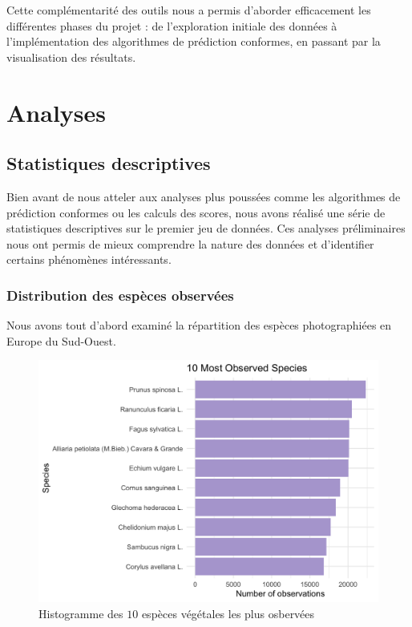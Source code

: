 \documentclass[a4paper,12pt]{article}
\begin{document}
\vspace{0.2cm}

Cette complémentarité des outils nous a permis d'aborder efficacement les différentes phases du projet : de l'exploration initiale des données à l'implémentation des algorithmes de prédiction conformes, en passant par la visualisation des résultats.


\section{Analyses}


\subsection{Statistiques descriptives}

Bien avant de nous atteler aux analyses plus poussées comme les algorithmes de prédiction conformes ou les calculs des scores, nous avons réalisé une série de statistiques descriptives sur le premier jeu de données. Ces analyses préliminaires nous ont permis de mieux comprendre la nature des données et d'identifier certains phénomènes intéressants.

\subsubsection{Distribution des espèces observées}

Nous avons tout d'abord examiné la répartition des espèces photographiées en Europe du Sud-Ouest.

\begin{figure}[H]
  \centering
  \includegraphics[scale=0.3]{images/10_Most_Observed_Species.png}
  \caption{Histogramme des $10$ espèces végétales les plus osbervées}
  \label{fig1}
\end{figure}
\end{document}
